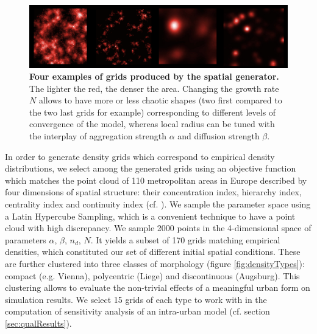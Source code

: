 \documentclass[preprint,5p,times,twocolumn,authoryear]{elsarticle}
\begin{document}
\begin{figure}[htbp] \begin{center} 
	\includegraphics[width=\linewidth]{figures/spatialGen.png}
 \caption{\textbf{Four examples of grids produced by the spatial generator.} The lighter the red, the denser the area. Changing the growth rate $N$ allows to have more or less chaotic shapes (two first compared to the two last grids for example) corresponding to different levels of convergence of the model, whereas local radius can be tuned with the interplay of aggregation strength $\alpha$ and diffusion strength $\beta$. }
\label{fig:spatialGen}
\end{center}
\end{figure} %



In order to generate density grids which correspond to empirical density distributions, we select among the generated grids using an objective function which matches the point cloud of 110 metropolitan areas in Europe described by four dimensions of spatial structure: their concentration index, hierarchy index, centrality index and continuity index (cf. \cite{LeNechet2015}). We sample the  parameter space using a Latin Hypercube Sampling, which is a convenient technique to have a point cloud with high discrepancy. We sample 2000 points in the 4-dimensional space of parameters {$\alpha$, $\beta$, $n_d$, $N$}. It yields a subset of 170  grids matching empirical densities, which constituted our set of different initial spatial conditions. These are further clustered into three classes of morphology (figure \ref{fig:densityTypes}): compact (e.g. Vienna), polycentric (Liege) and discontinuous (Augsburg). This clustering allows to evaluate the non-trivial effects of a meaningful urban form on simulation results. We select 15 grids of each type to work with in the computation of sensitivity analysis of an intra-urban model (cf. section \ref{sec:qualResults}).
\end{document}
